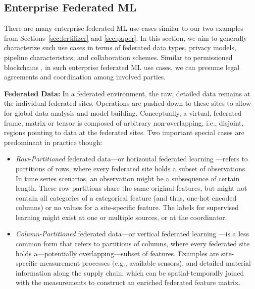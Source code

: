 \documentclass[sigconf,screen]{acmart}
\begin{document}
\subsection{Enterprise Federated ML}

There are many enterprise federated ML use cases similar to our two examples from Sections~\ref{sec:fertilizer} and \ref{sec:paper}. In this section, we aim to generally characterize such use cases in terms of federated data types, privacy models, pipeline characteristics, and collaboration schemes. Similar to permissioned blockchains \cite{GuptaHRS20,Mohan19,BakosHM21}, in such enterprise federated ML use cases, we can presume legal agreements and coordination among involved parties. 

\textbf{Federated Data:} In a federated environment, the raw, detailed data remains at the individual federated sites. Operations are pushed down to these sites to allow for global data analysis and model building. Conceptually, a virtual, federated frame, matrix or tensor is composed of arbitrary non-overlapping, i.e., disjoint, regions pointing to data at the federated sites. Two important special cases are predominant in practice though:
\begin{itemize}
\item \emph{Row-Partitioned} federated data---or horizontal federated learning \cite{BonawitzEGHIIKK19,YangLCT19}---refers to partitions of rows, where every federated site holds a subset of observations. In time series scenarios, an observation might be a subsequence of certain length. These row partitions share the same original features, but might not contain all categories of a categorical feature (and thus, one-hot encoded columns) or no values for a site-specific feature. The labels for supervised learning might exist at one or multiple sources, or at the coordinator.
\item \emph{Column-Partitioned} federated data---or vertical federated learning \cite{YangLCT19,WuCXCO20}---is a less common form that refers to partitions of columns, where every federated site holds a---potentially overlapping---subset of features. Examples are site-specific measurement processes (e.g., available sensors), and detailed material information along the supply chain, which can be spatial-temporally joined with the measurements to construct an enriched federated feature matrix.
\end{itemize}
\end{document}
